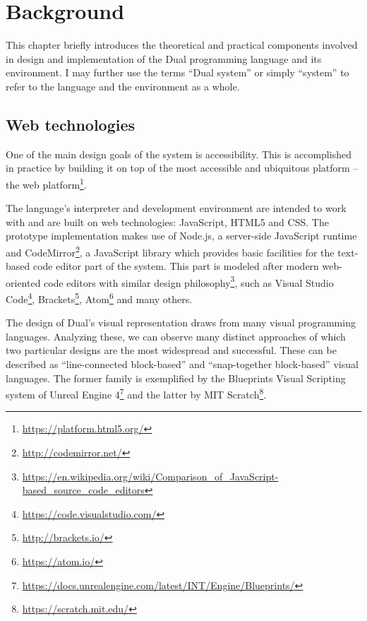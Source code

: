 \chapter{Background}\label{chap:background}
This chapter briefly introduces the theoretical and practical components
involved in design and implementation of the Dual programming language and its
environment. I may further use the terms ``Dual system'' or simply ``system'' to
refer to the language and the environment  as a whole.

\section{Web technologies}
One of the main design goals of the system is accessibility.
 This is
accomplished in practice by building it on top of the most accessible and
ubiquitous platform -- the web
platform\footnote{\url{https://platform.html5.org/}}.

The language's interpreter and development environment are intended to work with
and are built on web technologies: JavaScript, HTML5 and CSS. The prototype
implementation makes use of Node.js, a server-side JavaScript runtime and
CodeMirror\footnote{\url{http://codemirror.net/}}, a JavaScript library which
provides basic facilities for the text-based code editor part of the
system. This part is modeled after modern web-oriented code editors with similar
design
philosophy\footnote{\url{https://en.wikipedia.org/wiki/Comparison_of_JavaScript-based_source_code_editors}},
such as Visual Studio Code\footnote{\url{https://code.visualstudio.com/}},
Brackets\footnote{\url{http://brackets.io/}},
Atom\footnote{\url{https://atom.io/}} and many others.

The design of Dual's visual representation draws from many visual programming
languages. Analyzing these, we can observe many distinct approaches of which two
particular designs are the most widespread and successful. These can be
described as ``line-connected block-based'' and ``snap-together block-based''
visual languages. The former family is exemplified by the Blueprints Visual
Scripting system of Unreal Engine
4\footnote{\url{https://docs.unrealengine.com/latest/INT/Engine/Blueprints/}}
and the latter by MIT Scratch\footnote{\url{https://scratch.mit.edu/}}.

